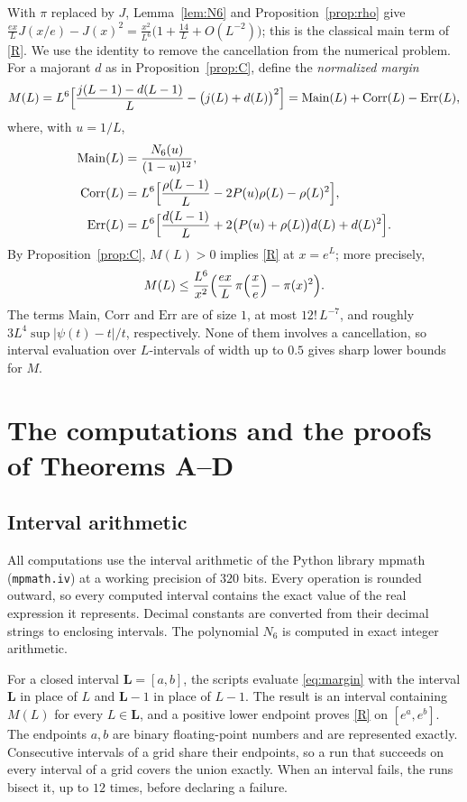 \documentclass{amsart}
\theoremstyle{definition}
\theoremstyle{remark}
\theoremstyle{plain}
\numberwithin{equation}{section}
\newcommand{\Main}{\mathrm{Main}}
\newcommand{\Corr}{\mathrm{Corr}}
\newcommand{\Err}{\mathrm{Err}}
\begin{document}
With $\pi$ replaced by $J$, Lemma~\ref{lem:N6} and Proposition~\ref{prop:rho} give $\frac{ex}{L}J(x/e)-J(x)^2=\frac{x^2}{L^6}\bigl(1+\frac{14}{L}+O(L^{-2})\bigr)$; this is the classical main term of \eqref{R}. We use the identity to remove the cancellation from the numerical problem. For a majorant $d$ as in Proposition~\ref{prop:C}, define the \emph{normalized margin}
\begin{equation}\label{eq:margin}
M(L)=L^6\Bigl[\frac{j(L-1)-d(L-1)}{L}-\bigl(j(L)+d(L)\bigr)^2\Bigr]=\Main(L)+\Corr(L)-\Err(L),
\end{equation}
where, with $u=1/L$,
\begin{align*}
\Main(L)&=\frac{N_6(u)}{(1-u)^{12}},\\
\Corr(L)&=L^6\Bigl[\frac{\rho(L-1)}{L}-2P(u)\rho(L)-\rho(L)^2\Bigr],\\
\Err(L)&=L^6\Bigl[\frac{d(L-1)}{L}+2\bigl(P(u)+\rho(L)\bigr)d(L)+d(L)^2\Bigr].
\end{align*}
By Proposition~\ref{prop:C}, $M(L)>0$ implies \eqref{R} at $x=e^L$; more precisely,
\[
M(L)\le\frac{L^6}{x^2}\Bigl(\frac{ex}{L}\,\pi\Bigl(\frac xe\Bigr)-\pi(x)^2\Bigr).
\]
The terms $\Main$, $\Corr$ and $\Err$ are of size $1$, at most $12!\,L^{-7}$, and roughly $3L^4\sup|\psi(t)-t|/t$, respectively. None of them involves a cancellation, so interval evaluation over $L$-intervals of width up to $0.5$ gives sharp lower bounds for $M$.

\section{The computations and the proofs of Theorems A--D}\label{sec:proofs}

\subsection{Interval arithmetic}\label{sec:ia}
All computations use the interval arithmetic of the Python library mpmath (\texttt{mpmath.iv}) at a working precision of $320$ bits. Every operation is rounded outward, so every computed interval contains the exact value of the real expression it represents. Decimal constants are converted from their decimal strings to enclosing intervals. The polynomial $N_6$ is computed in exact integer arithmetic.

For a closed interval $\mathbf L=[a,b]$, the scripts evaluate \eqref{eq:margin} with the interval $\mathbf L$ in place of $L$ and $\mathbf L-1$ in place of $L-1$. The result is an interval containing $M(L)$ for every $L\in\mathbf L$, and a positive lower endpoint proves \eqref{R} on $[e^a,e^b]$. The endpoints $a,b$ are binary floating-point numbers and are represented exactly. Consecutive intervals of a grid share their endpoints, so a run that succeeds on every interval of a grid covers the union exactly. When an interval fails, the runs bisect it, up to $12$ times, before declaring a failure.
\end{document}
